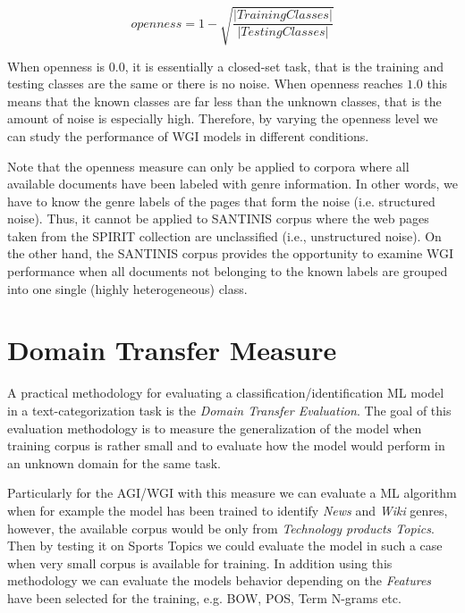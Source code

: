 {\begin{equation}\label{chap:eval_methods:eq:openness}
	openness=1-\sqrt{\frac{ | Training Classes | }{ |Testing Classes | }}
\end{equation}

When openness is $0.0$, it is essentially a closed-set task, that is the training and testing classes are the same or there is no noise. When openness reaches $1.0$ this means that the known classes are far less than the unknown classes, that is the amount of noise is especially high. Therefore, by varying the openness level we can study the performance of WGI models in different conditions.

Note that the openness measure can only be applied to corpora where all available documents have been labeled with genre information. In other words, we have to know the genre labels of the pages that form the noise (i.e. structured noise). Thus, it cannot be applied to SANTINIS corpus where the web pages taken from the SPIRIT collection are unclassified (i.e., unstructured noise). On the other hand, the SANTINIS corpus provides the opportunity to examine WGI performance when all documents not belonging to the known labels are grouped into one single (highly heterogeneous) class.



\section{Domain Transfer Measure}\label{chap:eval_methods:sec:domain_transfer_measure}

A practical methodology for evaluating a classification/identification ML model in a text-categorization task is the \textit{Domain Transfer Evaluation}. The goal of this evaluation methodology is to measure the generalization of the model when training corpus is rather small and to evaluate how the model would perform in an unknown domain for the same task. 

Particularly for the AGI/WGI with this measure we can evaluate a ML algorithm when for example the model has been trained to identify \textit{News} and \textit{Wiki} genres, however, the available corpus would be only from \textit{Technology products Topics}. Then by testing it on {Sports Topics} we could evaluate the model in such a case when very small corpus is available for training. In addition using this methodology we can evaluate the models behavior depending on the \textit{Features} have been selected for the training, e.g. BOW, POS, Term N-grams etc. 

}
